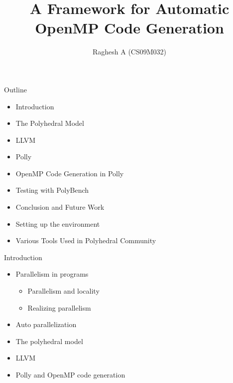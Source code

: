 \documentclass{beamer}
\title{A Framework for Automatic OpenMP Code Generation
 }
\author{Raghesh A (CS09M032)}
\date
\begin{document}
\begin{frame}
\titlepage
\end{frame}

\begin{frame}{Outline}
\begin{itemize}
\item Introduction
\item The Polyhedral Model
\item LLVM
\item Polly
\item OpenMP Code Generation in Polly
\item Testing with PolyBench
\item Conclusion and Future Work
\item Setting up the environment
\item Various Tools Used in Polyhedral Community
\end{itemize}
\end{frame}

\begin{frame}{Introduction}
\begin{itemize}
\item Parallelism in programs
	\begin{itemize}
	\item Parallelism and locality
	\item Realizing parallelism
	\end{itemize}
\item Auto parallelization
\item The polyhedral model
\item LLVM
\item Polly and OpenMP code generation
\end{itemize}
\end{frame}
\end{document}
